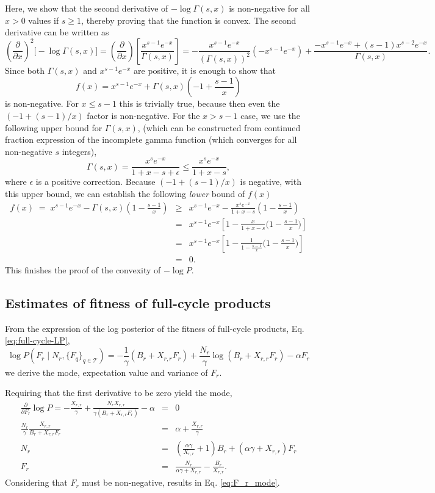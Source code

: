 \documentclass[letter,10pt,oneside]{article}
\newcommand{\be}{\begin{equation*}}
\newcommand{\ee}{\end{equation*}}
\newcommand{\ba}{\begin{eqnarray*}}
\newcommand{\ea}{\end{eqnarray*}}
\newcommand{\+}{^\dagger}
\newcommand{\refeq}[1]{Eq. \ref{#1}}
\begin{document}
\begin{appendix}
Here, we show that the second derivative of $-\log \Gamma(s, x)$ is non-negative for all $x>0$ values if $s\geq 1$, thereby proving that the function is convex. The second derivative can be written as
\be
  \left(\frac{\partial}{\partial x}\right)^2 \Big[-\log \Gamma(s, x)\Big] = \left(\frac{\partial}{\partial x}\right) \left[\frac{x^{s-1} e^{-x}}{\Gamma(s,x)}\right] = - \frac{x^{s-1} e^{-x}}{(\Gamma(s, x))^2} (-x^{s-1} e^{-x}) + \frac{-x^{s-1}e^{-x} + (s-1)x^{s-2} e^{-x}}{\Gamma(s,x)}.
\ee
Since both $\Gamma(s, x)$ and $x^{s-1} e^{-x}$ are positive, it is enough to show that
\be
  f(x) = x^{s-1} e^{-x} + \Gamma(s,x) \left(-1 + \frac{s-1}{x}\right)
\ee
is non-negative. For $x \leq s-1$ this is trivially true, because then even the $(-1 + (s-1)/x)$ factor is non-negative. For the $x > s-1$ case, we use the following upper bound for $\Gamma(s,x)$, (which can be constructed from continued fraction expression of the incomplete gamma function (which converges for all non-negative $s$ integers),
\be
  \Gamma(s, x) =  \frac{x^s e^{-x}}{1 + x - s + \epsilon} \leq \frac{x^s e^{-x}}{1 + x - s},
\ee
where $\epsilon$ is a positive correction. Because $(-1 + (s-1)/x)$ is negative, with this upper bound, we can establish the following \emph{lower} bound of $f(x)$
\ba
  f(x) \;=\; x^{s-1} e^{-x} - \Gamma(s,x) \left(1 - \frac{s-1}{x}\right) &\geq & x^{s-1} e^{-x} - \frac{x^s e^{-x}}{1 + x - s} \left(1 - \frac{s-1}{x}\right) \\
  &=& x^{s-1}e^{-x} \left[1 - \frac{x}{1 + x-s}\Big(1 - \frac{s-1}{x}\Big)\right] \\
  &=& x^{s-1}e^{-x}\left[1 - \frac{1}{1 - \frac{s-1}{x}}\Big(1 - \frac{s-1}{x}\Big) \right] \\
  &=& 0.
\ea
This finishes the proof of the convexity of $-\log P$.

\subsection{Estimates of fitness of full-cycle products}
\label{app:full-cycle-fitness}
From the expression of the log posterior of the fitness of full-cycle products, \refeq{eq:full-cycle-LP}, 
\be
  \log P(F_r\;|\;N_r, \{F_q\}_{q\in \mathcal{T}}) = -\frac{1}{\gamma}(B_r + X_{r,r}F_r) + \frac{N_r}{\gamma}\log(B_r + X_{r,r} F_r) - \alpha F_r
\ee
we derive the mode, expectation value and variance of $F_r$.

Requiring that the first derivative to be zero yield the mode,
  \ba
    \frac{\partial}{\partial F_r} \log P = -\frac{X_{r,r}}{\gamma} + \frac{N_r X_{r,r}}{\gamma(B_r + X_{r,r}F_r)} - \alpha &=& 0  \\
    \frac{N_r}{\gamma}\frac{X_{r,r}}{B_r + X_{r,r}F_r} &=& \alpha + \frac{X_{r,r}}{\gamma} \\
    N_r &=& \left(\frac{\alpha\gamma}{X_{r,r}} + 1\right) B_r + (\alpha\gamma + X_{r,r})F_r \\
    F_r &=& \frac{N_r}{\alpha \gamma + X_{r,r}} - \frac{B_r}{X_{r,r}}.
  \ea
  Considering that $F_r$ must be non-negative, results in \refeq{eq:F_r_mode}.  
  

\end{appendix}
\end{document}
